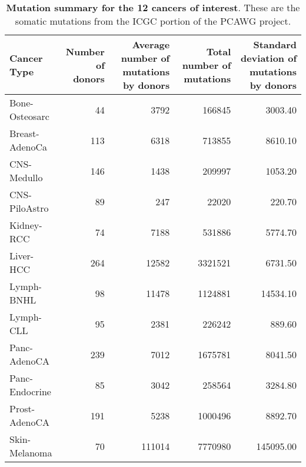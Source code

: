 \begin{table}[hp!]
\centering
\caption{\textbf{Mutation summary for the 12 cancers of interest}. These are the somatic mutations from the ICGC portion of the PCAWG project.}
\label{tab:mutation_summary}
\begin{tabulary}{\textwidth}{ lRRRR }
\hline
\bf{Cancer Type} & \bf{Number of donors} & \bf{Average number of mutations by donors} & \bf{Total number of mutations} & \bf{Standard deviation of mutations by donors} \\
\hline
  Bone-Osteosarc &               44 &                   3792 &                    166845 &                       3003.40 \\
  Breast-AdenoCa &              113 &                   6318 &                    713855 &                       8610.10 \\
     CNS-Medullo &              146 &                   1438 &                    209997 &                       1053.20 \\
   CNS-PiloAstro &               89 &                    247 &                     22020 &                        220.70 \\
      Kidney-RCC &               74 &                   7188 &                    531886 &                       5774.70 \\
       Liver-HCC &              264 &                  12582 &                   3321521 &                       6731.50 \\
      Lymph-BNHL &               98 &                  11478 &                   1124881 &                      14534.10 \\
       Lymph-CLL &               95 &                   2381 &                    226242 &                        889.60 \\
    Panc-AdenoCA &              239 &                   7012 &                   1675781 &                       8041.50 \\
  Panc-Endocrine &               85 &                   3042 &                    258564 &                       3284.80 \\
   Prost-AdenoCA &              191 &                   5238 &                   1000496 &                       8892.70 \\
   Skin-Melanoma &               70 &                 111014 &                   7770980 &                     145095.00 \\
\hline
\end{tabulary}
\end{table}

